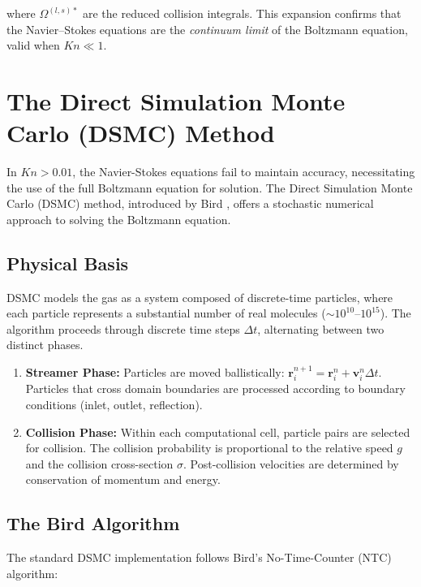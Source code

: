 \noindent where $\Omega^{(l,s)*}$ are the reduced collision integrals. This expansion confirms that the Navier--Stokes equations are the \textit{continuum limit} of the Boltzmann equation, valid when $Kn \ll 1$.

\section{The Direct Simulation Monte Carlo (DSMC) Method}

In $Kn > 0.01$, the Navier-Stokes equations fail to maintain accuracy, necessitating the use of the full Boltzmann equation for solution. The Direct Simulation Monte Carlo (DSMC) method, introduced by Bird \cite{bird1994molecular}, offers a stochastic numerical approach to solving the Boltzmann equation.

\subsection{Physical Basis}

DSMC models the gas as a system composed of discrete-time particles, where each particle represents a substantial number of real molecules ($\sim 10^{10}$--$10^{15}$). The algorithm proceeds through discrete time steps $\Delta t$, alternating between two distinct phases.

\begin{enumerate}
    \item \textbf{Streamer Phase:} Particles are moved ballistically: $\mathbf{r}_{i}^{n+1} = \mathbf{r}_{i}^{n} + \mathbf{v}_{i}^{n} \Delta t$. Particles that cross domain boundaries are processed according to boundary conditions (inlet, outlet, reflection).

    \item \textbf{Collision Phase:} Within each computational cell, particle pairs are selected for collision. The collision probability is proportional to the relative speed $g$ and the collision cross-section $\sigma$. Post-collision velocities are determined by conservation of momentum and energy.
\end{enumerate}

\subsection{The Bird Algorithm}

The standard DSMC implementation follows Bird's No-Time-Counter (NTC) algorithm:

